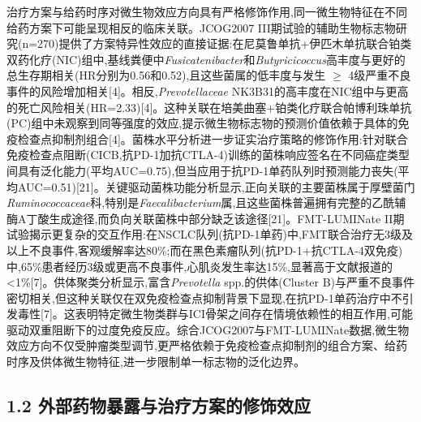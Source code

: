 治疗方案与给药时序对微生物效应方向具有严格修饰作用,同一微生物特征在不同给药方案下可能呈现相反的临床关联。JCOG2007 III期试验的辅助生物标志物研究(n=270)提供了方案特异性效应的直接证据:在尼莫鲁单抗+伊匹木单抗联合铂类双药化疗(NIC)组中,基线粪便中\emph{Fusicatenibacter}和\emph{Butyricicoccus}高丰度与更好的总生存期相关(HR分别为0.56和0.52),且这些菌属的低丰度与发生 \(\geq\) 4级严重不良事件的风险增加相关{[}4{]}。相反,\emph{Prevotellaceae} NK3B31的高丰度在NIC组中与更高的死亡风险相关(HR=2.33){[}4{]}。这种关联在培美曲塞+铂类化疗联合帕博利珠单抗(PC)组中未观察到同等强度的效应,提示微生物标志物的预测价值依赖于具体的免疫检查点抑制剂组合{[}4{]}。菌株水平分析进一步证实治疗策略的修饰作用:针对联合免疫检查点阻断(CICB,抗PD-1加抗CTLA-4)训练的菌株响应签名在不同癌症类型间具有泛化能力(平均AUC=0.75),但当应用于抗PD-1单药队列时预测能力丧失(平均AUC=0.51){[}21{]}。关键驱动菌株功能分析显示,正向关联的主要菌株属于厚壁菌门\emph{Ruminococcaceae}科,特别是\emph{Faecalibacterium}属,且这些菌株普遍拥有完整的乙酰辅酶A丁酸生成途径,而负向关联菌株中部分缺乏该途径{[}21{]}。FMT-LUMINate II期试验揭示更复杂的交互作用:在NSCLC队列(抗PD-1单药)中,FMT联合治疗无3级及以上不良事件,客观缓解率达80\%;而在黑色素瘤队列(抗PD-1+抗CTLA-4双免疫)中,65\%患者经历3级或更高不良事件,心肌炎发生率达15\%,显著高于文献报道的\textless1\%{[}7{]}。供体聚类分析显示,富含\emph{Prevotella} spp.的供体(Cluster B)与严重不良事件密切相关,但这种关联仅在双免疫检查点抑制背景下显现,在抗PD-1单药治疗中不引发毒性{[}7{]}。这表明特定微生物类群与ICI骨架之间存在情境依赖性的相互作用,可能驱动双重阻断下的过度免疫反应。综合JCOG2007与FMT-LUMINate数据,微生物效应方向不仅受肿瘤类型调节,更严格依赖于免疫检查点抑制剂的组合方案、给药时序及供体微生物特征,进一步限制单一标志物的泛化边界。

\subsection{1.2 外部药物暴露与治疗方案的修饰效应}\label{ux5916ux90e8ux836fux7269ux66b4ux9732ux4e0eux6cbbux7597ux65b9ux6848ux7684ux4feeux9970ux6548ux5e94}

